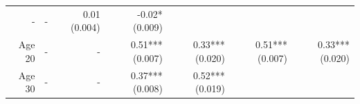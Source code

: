 \documentclass[]{article}
\begin{document}
\begin{longtable}[c]{@{}rrrrrrr@{}}
\begin{minipage}[t]{0.11\columnwidth}
-
\strut\end{minipage} &
\begin{minipage}[t]{0.12\columnwidth}\raggedleft\strut
-
\strut\end{minipage} &
\begin{minipage}[t]{0.11\columnwidth}\raggedleft\strut
0.01 (0.004)
\strut\end{minipage} &
\begin{minipage}[t]{0.11\columnwidth}\raggedleft\strut
-0.02* (0.009)
\strut\end{minipage}\tabularnewline
\begin{minipage}[t]{0.12\columnwidth}\raggedleft\strut
Age 20
\strut\end{minipage} &
\begin{minipage}[t]{0.11\columnwidth}\raggedleft\strut
-
\strut\end{minipage} &
\begin{minipage}[t]{0.12\columnwidth}\raggedleft\strut
-
\strut\end{minipage} &
\begin{minipage}[t]{0.11\columnwidth}\raggedleft\strut
0.51*** (0.007)
\strut\end{minipage} &
\begin{minipage}[t]{0.12\columnwidth}\raggedleft\strut
0.33*** (0.020)
\strut\end{minipage} &
\begin{minipage}[t]{0.11\columnwidth}\raggedleft\strut
0.51*** (0.007)
\strut\end{minipage} &
\begin{minipage}[t]{0.11\columnwidth}\raggedleft\strut
0.33*** (0.020)
\strut\end{minipage}\tabularnewline
\begin{minipage}[t]{0.12\columnwidth}\raggedleft\strut
Age 30
\strut\end{minipage} &
\begin{minipage}[t]{0.11\columnwidth}\raggedleft\strut
-
\strut\end{minipage} &
\begin{minipage}[t]{0.12\columnwidth}\raggedleft\strut
-
\strut\end{minipage} &
\begin{minipage}[t]{0.11\columnwidth}\raggedleft\strut
0.37*** (0.008)
\strut\end{minipage} &
\begin{minipage}[t]{0.12\columnwidth}\raggedleft\strut
0.52*** (0.019)
\strut\end{minipage} &

\end{longtable}
\end{document}
